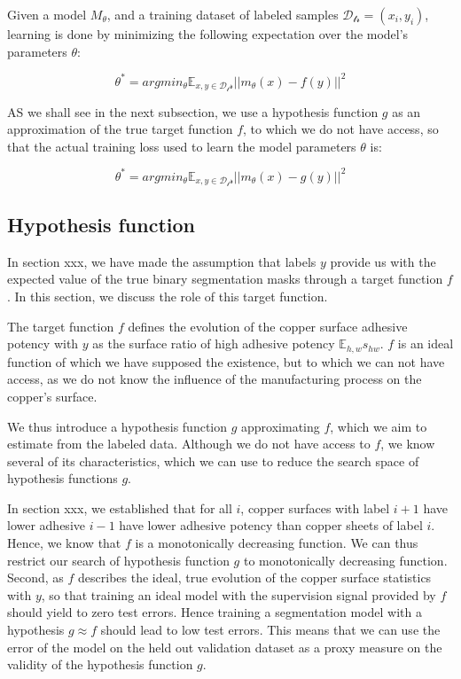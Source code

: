 \documentclass[10pt,twocolumn,letterpaper]{article}
\begin{document}
Given a model $M_{\theta}$, and a training dataset of labeled samples $\mathcal{D_{tr}}={(x_i, y_i)}$,
learning is done by minimizing the following expectation over the model's parameters $\theta$:

$$\theta^* = argmin_{\theta} \mathbb{E}_{x,y \in \mathcal{D_tr}} ||m_{\theta}(x) - f(y) ||^2 $$

AS we shall see in the next subsection, we use a hypothesis function $g$ 
as an approximation of the true target function $f$, to which we do not have access, 
so that the actual training loss used to learn the model parameters $\theta$ is:

$$\theta^* = argmin_{\theta} \mathbb{E}_{x,y \in \mathcal{D_tr}} ||m_{\theta}(x) - g(y) ||^2 $$

\subsection{Hypothesis function}

In section xxx, we have made the assumption 
that labels $y$ provide us with the expected value 
of the true binary segmentation masks through a target function $f$.
In this section, we discuss the role of this target function.

The target function $f$ defines the evolution of the copper surface adhesive potency with $y$ as the surface ratio of high adhesive potency $\mathbb{E}_{h,w}s_{hw}$.
$f$ is an ideal function of which we have supposed the existence, 
but to which we can not have access,
as we do not know the influence of the manufacturing process on the copper's surface.

We thus introduce a hypothesis function $g$ approximating $f$,
which we aim to estimate from the labeled data.
Although we do not have access to $f$, we know several of its characteristics,
which we can use to reduce the search space of hypothesis functions $g$.

In section xxx, we established that for all $i$, copper surfaces with label $i+1$ have lower 
adhesive $i-1$ have lower adhesive potency than copper sheets of label $i$.
Hence, we know that $f$ is a monotonically decreasing function.
We can thus restrict our search of hypothesis function $g$ to monotonically decreasing function.
Second, as $f$ describes the ideal, true evolution of the copper surface statistics with $y$,
so that training an ideal model with the supervision signal provided by $f$ should yield to zero test errors.
Hence training a segmentation model with a hypothesis $g \approx f$ should lead to low test errors.
This means that we can use the error of the model on the held out validation dataset as a proxy measure on
the validity of the hypothesis function $g$.
\end{document}
